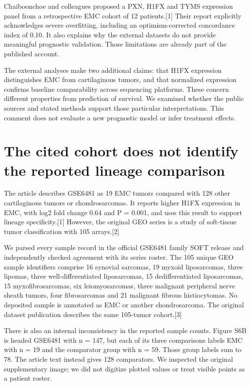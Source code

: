 \documentclass[11pt]{article}
\begin{document}
Chaiboonchoe and colleagues proposed a PXN, H1FX and TYMS expression panel from a retrospective EMC cohort of 12 patients.[1] Their report explicitly acknowledges severe overfitting, including an optimism-corrected concordance index of 0.10. It also explains why the external datasets do not provide meaningful prognostic validation. Those limitations are already part of the published account.\par

The external analyses make two additional claims: that H1FX expression distinguishes EMC from cartilaginous tumors, and that normalized expression confirms baseline comparability across sequencing platforms. These concern different properties from prediction of survival. We examined whether the public sources and stated methods support those particular interpretations. This comment does not evaluate a new prognostic model or infer treatment effects.\par

\section*{The cited cohort does not identify the reported lineage comparison}

The article describes GSE6481 as 19 EMC tumors compared with 128 other cartilaginous tumors or chondrosarcomas. It reports higher H1FX expression in EMC, with log2 fold change 0.64 and P = 0.001, and uses this result to support lineage specificity.[1] However, the original GEO series is a study of soft-tissue tumor classification with 105 arrays.[2]\par

We parsed every sample record in the official GSE6481 family SOFT release and independently checked agreement with its series roster. The 105 unique GEO sample identifiers comprise 16 synovial sarcomas, 19 myxoid liposarcomas, three lipomas, three well-differentiated liposarcomas, 15 dedifferentiated liposarcomas, 15 myxofibrosarcomas, six leiomyosarcomas, three malignant peripheral nerve sheath tumors, four fibrosarcomas and 21 malignant fibrous histiocytomas. No deposited sample is annotated as EMC or another chondrosarcoma. The original dataset publication describes the same 105-tumor cohort.[3]\par

There is also an internal inconsistency in the reported sample counts. Figure S6B is headed GSE6481 with n = 147, but each of its three comparisons labels EMC with n = 19 and the comparator group with n = 59. Those group labels sum to 78. The article text instead gives 128 comparators. We inspected the original supplementary image; we did not digitize plotted values or treat visible points as a patient roster.\par
\end{document}
